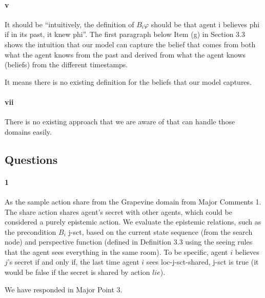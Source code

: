 \documentclass[letterpaper]{article} %
\begin{document}
\paragraph{v} 
It should be ``intuitively, the definition of $B_i \varphi$ should be that agent i believes phi if in its past, it knew phi''. The first paragraph below Item (g) in Section 3.3 shows the intuition that our model can capture the belief that comes from both what the agent knows from the past and derived from what the agent knows (beliefs) from the different timestamps.

It means there is no existing definition for the beliefs that our model captures.



\paragraph{vii}
There is no existing approach that we are aware of that can handle those domains easily. 

\subsection{Questions}
\paragraph{1}
As the sample action share from the Grapevine domain from Major Comments 1.
The share action shares agent's secret with other agents, which could be considered a purely epistemic action.
We evaluate the epistemic relations, such as the precondition $B_i$ j-sct, based on the current state sequence (from the search node) and perspective function (defined in Definition 3.3 using the seeing rules that the agent sees everything in the same room).
To be specific, agent $i$ believes $j$'s secret if and only if, the last time agent $i$ sees loc-j-sct-shared, j-sct is true (it would be false if the secret is shared by action $lie$).



We have responded in Major Point 3.
\end{document}
